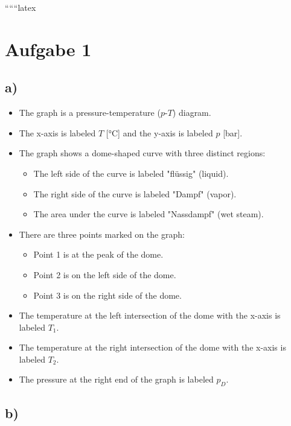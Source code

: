
``````latex


\section*{Aufgabe 1}

\subsection*{a)}

\begin{itemize}
    \item The graph is a pressure-temperature ($p$-$T$) diagram.
    \item The x-axis is labeled $T$ [°C] and the y-axis is labeled $p$ [bar].
    \item The graph shows a dome-shaped curve with three distinct regions: 
        \begin{itemize}
            \item The left side of the curve is labeled "flüssig" (liquid).
            \item The right side of the curve is labeled "Dampf" (vapor).
            \item The area under the curve is labeled "Nassdampf" (wet steam).
        \end{itemize}
    \item There are three points marked on the graph:
        \begin{itemize}
            \item Point 1 is at the peak of the dome.
            \item Point 2 is on the left side of the dome.
            \item Point 3 is on the right side of the dome.
        \end{itemize}
    \item The temperature at the left intersection of the dome with the x-axis is labeled $T_1$.
    \item The temperature at the right intersection of the dome with the x-axis is labeled $T_2$.
    \item The pressure at the right end of the graph is labeled $p_D$.
\end{itemize}

\subsection*{b)}

